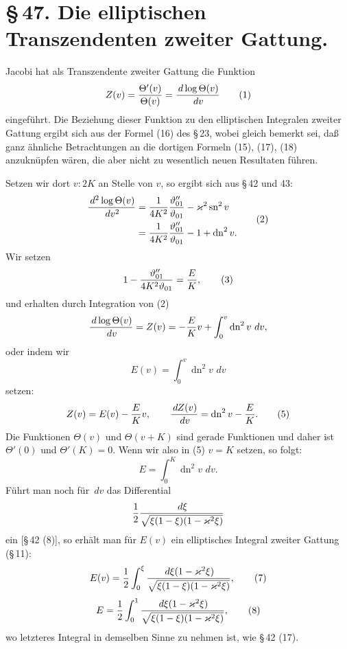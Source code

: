 \documentclass[11pt]{article}
\providecommand{\dd}{\,d}
\providecommand{\tht}{\vartheta}
\providecommand{\sn}{\operatorname{sn}}
\providecommand{\dn}{\operatorname{dn}}
\begin{document}
\section*{\S\,47. Die elliptischen Transzendenten zweiter Gattung.}

Jacobi hat als Transzendente zweiter Gattung die Funktion
\begin{equation}
Z(v)={\Theta'(v)\over\Theta(v)}={\dd\log\Theta(v)\over\dd v}
\tag{1}
\end{equation}
eingeführt. Die Beziehung dieser Funktion zu den elliptischen Integralen zweiter Gattung ergibt sich aus der Formel (16) des \S\,23, wobei gleich bemerkt sei, daß ganz ähnliche Betrachtungen an die dortigen Formeln (15), (17), (18) anzuknüpfen wären, die aber nicht zu wesentlich neuen Resultaten führen.

Setzen wir dort $v:2K$ an Stelle von $v$, so ergibt sich aus \S\,42 und 43:
\begin{equation}
\begin{aligned}
{\dd^2\log\Theta(v)\over\dd v^2}
&={1\over4K^2}{\tht_{01}''\over\tht_{01}}-\varkappa^2\sn^2v\\
&={1\over4K^2}{\tht_{01}''\over\tht_{01}}-1+\dn^2v.
\end{aligned}
\tag{2}
\end{equation}
Wir setzen
\begin{equation}
1-{\tht_{01}''\over4K^2\tht_{01}}={E\over K},
\tag{3}
\end{equation}
und erhalten durch Integration von (2)
\[
{\dd\log\Theta(v)\over\dd v}=Z(v)=-{E\over K}v+\int_0^v\dn^2v\,\dd v,
\]
oder indem wir
\begin{equation}
E(v)=\int_0^v\dn^2v\,\dd v
\tag{4}
\end{equation}
setzen:
\begin{equation}
Z(v)=E(v)-{E\over K}v,
\qquad
{\dd Z(v)\over\dd v}=\dn^2v-{E\over K}.
\tag{5}
\end{equation}
Die Funktionen $\Theta(v)$ und $\Theta(v+K)$ sind gerade Funktionen und daher ist $\Theta'(0)$ und $\Theta'(K)=0$. Wenn wir also in (5) $v=K$ setzen, so folgt:
\begin{equation}
E=\int_0^K\dn^2v\,\dd v.
\tag{6}
\end{equation}
Führt man noch für $\dd v$ das Differential
\[
{1\over2}{\dd\xi\over\sqrt{\xi(1-\xi)(1-\varkappa^2\xi)}}
\]
ein [\S\,42 (8)], so erhält man für $E(v)$ ein elliptisches Integral zweiter Gattung (\S\,11):
\begin{equation}
E(v)={1\over2}\int_0^{\xi}{\dd\xi(1-\varkappa^2\xi)\over\sqrt{\xi(1-\xi)(1-\varkappa^2\xi)}},
\tag{7}
\end{equation}
\begin{equation}
E={1\over2}\int_0^{1}{\dd\xi(1-\varkappa^2\xi)\over\sqrt{\xi(1-\xi)(1-\varkappa^2\xi)}},
\tag{8}
\end{equation}
wo letzteres Integral in demselben Sinne zu nehmen ist, wie \S\,42 (17).
\end{document}
